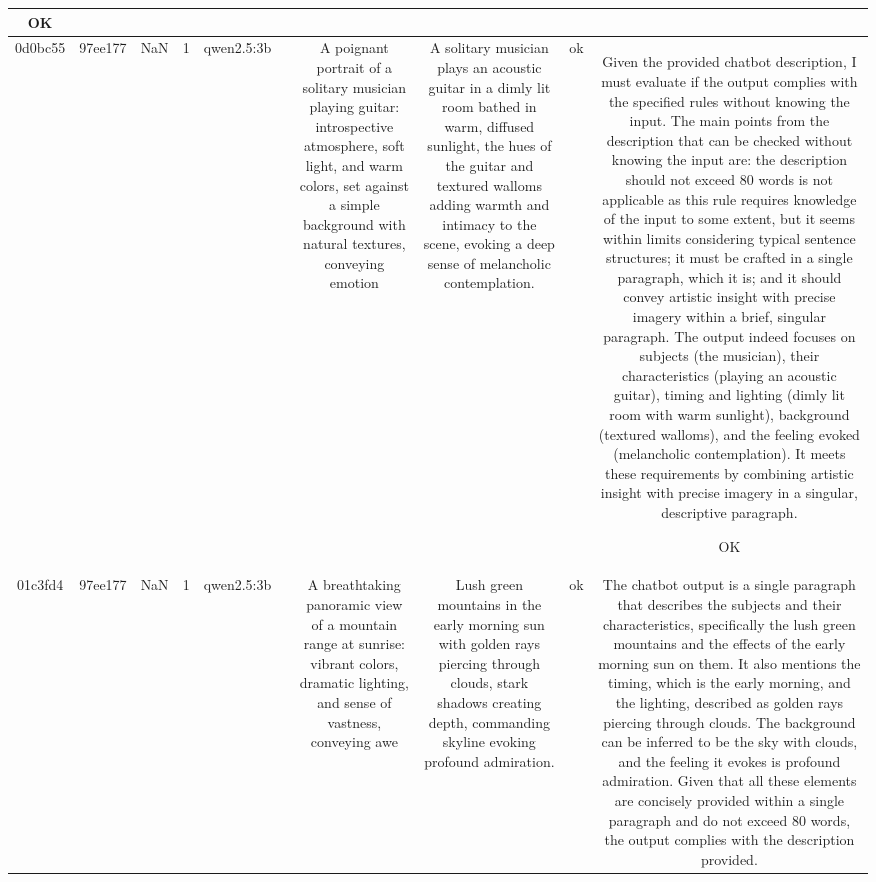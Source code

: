 \begin{table}[h!]
\begin{tabular}{|c|c|c|c|c|c|c|c|c|c|}
OK\\
\hline
0d0bc55 & 97ee177 & NaN & 1 & qwen2.5:3b &  & A poignant portrait of a solitary musician playing guitar: introspective atmosphere, soft light, and warm colors, set against a simple background with natural textures, conveying emotion & A solitary musician plays an acoustic guitar in a dimly lit room bathed in warm, diffused sunlight, the hues of the guitar and textured walloms adding warmth and intimacy to the scene, evoking a deep sense of melancholic contemplation. & ok & Given the provided chatbot description, I must evaluate if the output complies with the specified rules without knowing the input. The main points from the description that can be checked without knowing the input are: the description should not exceed 80 words is not applicable as this rule requires knowledge of the input to some extent, but it seems within limits considering typical sentence structures; it must be crafted in a single paragraph, which it is; and it should convey artistic insight with precise imagery within a brief, singular paragraph. The output indeed focuses on subjects (the musician), their characteristics (playing an acoustic guitar), timing and lighting (dimly lit room with warm sunlight), background (textured walloms), and the feeling evoked (melancholic contemplation). It meets these requirements by combining artistic insight with precise imagery in a singular, descriptive paragraph.

OK\\
\hline
01c3fd4 & 97ee177 & NaN & 1 & qwen2.5:3b &  & A breathtaking panoramic view of a mountain range at sunrise: vibrant colors, dramatic lighting, and sense of vastness, conveying awe & Lush green mountains in the early morning sun with golden rays piercing through clouds, stark shadows creating depth, commanding skyline evoking profound admiration. & ok & The chatbot output is a single paragraph that describes the subjects and their characteristics, specifically the lush green mountains and the effects of the early morning sun on them. It also mentions the timing, which is the early morning, and the lighting, described as golden rays piercing through clouds. The background can be inferred to be the sky with clouds, and the feeling it evokes is profound admiration. Given that all these elements are concisely provided within a single paragraph and do not exceed 80 words, the output complies with the description provided.


\end{tabular}
\end{table}
